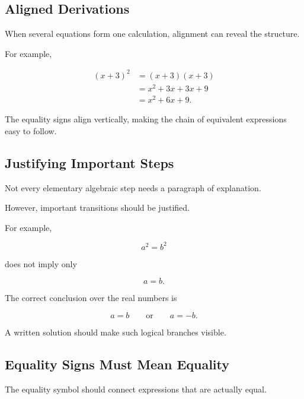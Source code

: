 \subsection{Aligned Derivations}
\label{subsec:aligned-derivations}

When several equations form one calculation, alignment can reveal the
structure.

For example,

\[
\begin{aligned}
(x+3)^2
&=(x+3)(x+3)\\
&=x^2+3x+3x+9\\
&=x^2+6x+9.
\end{aligned}
\]

The equality signs align vertically, making the chain of equivalent
expressions easy to follow.

\subsection{Justifying Important Steps}
\label{subsec:justifying-steps}

Not every elementary algebraic step needs a paragraph of explanation.

However, important transitions should be justified.

For example,

\[ a^2=b^2 \]

does not imply only

\[ a=b. \]

The correct conclusion over the real numbers is

\[ a=b\qquad\text{or}\qquad a=-b. \]

A written solution should make such logical branches visible.

\subsection{Equality Signs Must Mean Equality}
\label{subsec:equality-sign-writing}

The equality symbol should connect expressions that are actually equal.


